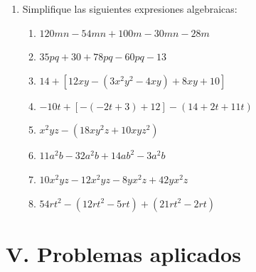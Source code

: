 \documentclass[12pt]{article}
\begin{document}
	\begin{enumerate}
		\item Simplifique las siguientes expresiones algebraicas:
		\begin{enumerate}
			\item $120mn - 54mn + 100m - 30mn - 28m$
			\item $35pq + 30 + 78pq - 60pq - 13$
			\item $14 + [12xy - (3x^2y^2 - 4xy) + 8xy + 10]$
			\item $-10t + [ -(-2t + 3) + 12] - (14 + 2t + 11t)$
			\item $x^2yz - (18xy^2z + 10xyz^2)$
			\item $11a^2b - 32a^2b + 14ab^2 - 3a^2b$
			\item $10x^2yz - 12x^2yz - 8yx^2z + 42yx^2z$			
			\item $54rt^2 - (12rt^2 - 5rt) + (21rt^2 - 2rt)$
		\end{enumerate}
	\end{enumerate}
	
	\newpage
	
	\textsc{\vspace*{0.5em}}
		
	\section*{V. Problemas aplicados}
		
\end{document}
